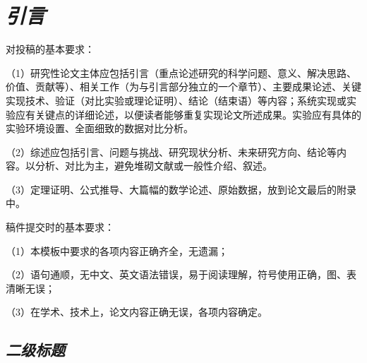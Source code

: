 \documentclass{cjc}
\begin{document}
\newcommand{\sect}[1]{\section{\textbf\emph{#1}}}
\newcommand{\ssect}[1]{\subsection{\textbf\emph{#1}}}
\newcommand{\sssect}[1]{\subsubsection{\textbf\emph{#1}}}


\maketitle

\sect{引言}

对投稿的基本要求：

（1）研究性论文主体应包括引言（重点论述研究的科学问题、意义、解决思路、价值、贡献等）、相关工作（为与引言部分独立的一个章节）、主要成果论述、关键实现技术、验证（对比实验或理论证明）、结论（结束语）等内容；系统实现或实验应有关键点的详细论述，以便读者能够重复实现论文所述成果。实验应有具体的实验环境设置、全面细致的数据对比分析\cite{wy}。

（2）综述应包括引言、问题与挑战、研究现状分析、未来研究方向、结论等内容。以分析、对比为主，避免堆砌文献或一般性介绍、叙述\cite{wf}。

（3）定理证明、公式推导、大篇幅的数学论述、原始数据，放到论文最后的附录中。

稿件提交时的基本要求：

（1）本模板中要求的各项内容正确齐全，无遗漏；

（2）语句通顺，无中文、英文语法错误，易于阅读理解，符号使用正确，图、表清晰无误；

（3）在学术、技术上，论文内容正确无误，各项内容确定。

\ssect{二级标题}
\end{document}
